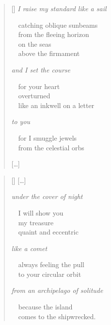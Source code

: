 \documentclass[14pt]{extbook}
\newcommand*{\centeredornament}{\centerline{\pgfornament[width=6cm]{88}}}
\begin{document}

\newpage

\vspace*{-15mm}
\centeredornament
\vspace*{-7mm}



\begin{verse}[\versewidth]
  \emph{I raise my standard like a sail}

  \ \ catching oblique sunbeams \\
  \ \ from the fleeing horizon \\
  \ \ on the seas \\
  \ \ above the firmament

  \emph{and I set the course}

  \ \ for your heart \\
  \ \ overturned \\
  \ \ like an inkwell on a letter

  \emph{to you}

  \ \ for I smuggle jewels \\
  \ \ from the celestial orbs

  \hfill [\ldots]
\end{verse}

\newpage

\vspace*{-15mm}
\centeredornament
\vspace*{-7mm}

\poemtitle*{\phantom{XVII}}


\begin{verse}[\versewidth]
  \textnormal{[\ldots]}

  \emph{under the cover of night}

  \ \ I will show you \\
  \ \ my treasure \\
  \ \ quaint and eccentric

  \emph{like a comet}

  \ \ always feeling the pull \\
  \ \ to your circular orbit

  \emph{from an archipelago of solitude}

  \ \ because the island \\
  \ \ comes to the shipwrecked.
\end{verse}
\end{document}
